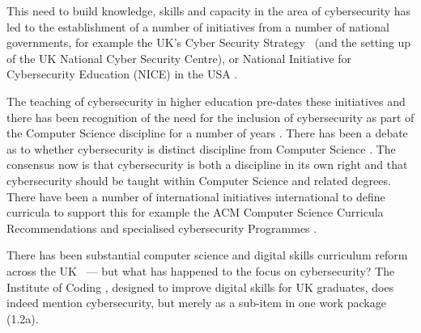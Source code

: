 \documentclass[conference]{IEEEtran}
\begin{document}

This need to build knowledge, skills and capacity in the area of cybersecurity has led to the establishment of a number of initiatives from a number of national governments, for example the UK's Cyber Security Strategy~\cite{UKCabinetOffice} (and the setting up of the UK National Cyber Security Centre), or National Initiative for Cybersecurity Education (NICE) in the USA \cite{NICE}. 

The teaching of cybersecurity in higher education pre-dates these initiatives and there has been recognition of the need for the inclusion of cybersecurity as part of the Computer Science discipline for a number of years \cite{Hentea2006}. There has been a debate as to whether cybersecurity is distinct discipline from Computer Science \cite{McGettrick2013}. The consensus now is that cybersecurity is both a discipline in its own right and that cybersecurity should be taught within Computer Science and related degrees. There have been a number of international initiatives international to define curricula to support this for example the ACM Computer Science Curricula Recommendations \cite[which added ``Information Assurance and Security'' for the first time]{ACM2013a} and specialised cybersecurity Programmes \cite{ACMIEEEAISSIGSECIFIP}.


There has been substantial computer science and digital skills curriculum reform across the UK~\cite{brown-et-al:toce2014,moller+crick:jce2018} --- but what has happened to the focus on cybersecurity? The Institute of Coding \cite{Davenportetal2019a}, designed to improve digital skills for UK graduates, does indeed mention cybersecurity, but merely as a sub-item in one work package (1.2a).

\end{document}
